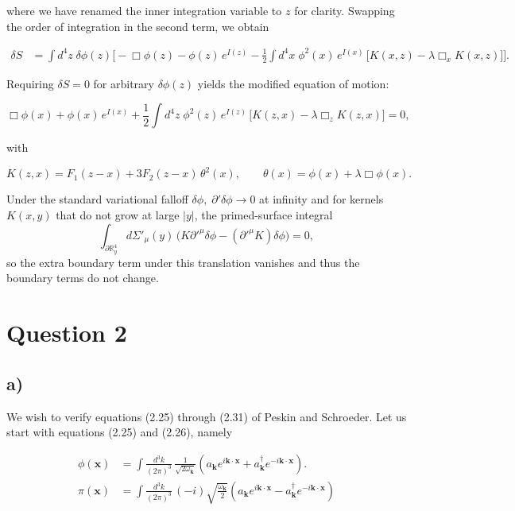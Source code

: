 \documentclass[12pt]{article}
\newcommand{\w}{\omega}
\begin{document}
where we have renamed the inner integration variable to $z$ for clarity. Swapping the order of integration in the second term, we obtain

\begin{align}
\delta S &= \int d^4z \; \delta\phi(z) \Bigg[ - \Box \phi(z) - \phi(z) \, e^{I(z)} 
- \frac{1}{2} \int d^4x \; \phi^2(x) \, e^{I(x)} \, \big[ K(x,z) - \lambda \Box_x K(x,z) \big] \Bigg].
\end{align}

Requiring $\delta S = 0$ for arbitrary $\delta\phi(z)$ yields the modified equation of motion:

\begin{equation}
\boxed{
\Box \phi(x) + \phi(x) \, e^{I(x)} + \frac{1}{2} \int d^4z \; \phi^2(z) \, e^{I(z)} \, \big[ K(z,x) - \lambda \Box_z K(z,x) \big] = 0,
}
\end{equation}

with

\[
K(z,x) = F_1(z-x) + 3 F_2(z-x) \, \theta^2(x), \qquad \theta(x) = \phi(x) + \lambda \Box \phi(x).
\]

Under the standard variational falloff $\delta\phi,\;\partial'\delta\phi\to0$ at infinity and for kernels $K(x,y)$ that do not grow at large $|y|$, the primed-surface integral
\[
\int_{\partial\mathbb R^4_y} d\Sigma'_\mu(y)\,\big( K\partial'^\mu\delta\phi-(\partial'^\mu K)\delta\phi\big)=0,
\]
so the extra boundary term under this translation vanishes and thus the boundary
terms do not change.

\section*{Question 2}
\subsection*{a)}

We wish to verify equations (2.25) through (2.31) of Peskin and Schroeder. Let
us start with equations (2.25) and (2.26), namely

\begin{align}
    \phi(\mathbf{x}) &= \int \frac{d^3k}{(2\pi)^3} \,
        \frac{1}{\sqrt{2\omega_{\mathbf{k}}}} \left( a_{\mathbf{k}}
        e^{i\mathbf{k}\cdot \mathbf{x}} + a_{\mathbf{k}}^{\dagger}
        e^{-i\mathbf{k}\cdot \mathbf{x}} \right). \\
    \pi(\mathbf{x}) &= \int \frac{d^3k}{(2\pi)^3}
        \,(-i)\sqrt{\frac{\w_{\mathbf{k}}}{2}} \left(a_{\mathbf{k}}e^{i\mathbf{k
        \cdot x}} - a_{\mathbf{k}}^{\dagger}e^{-i\mathbf{k \cdot x}}\right)
\end{align}
\end{document}
